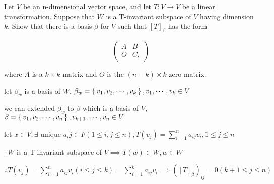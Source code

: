 Let $V$ be an n-dimensional vector space, and let $T: V \rightarrow V$ be a linear transformation. Suppose that $W$ is a T-invariant subspace of $V$ having dimension $k$. Show that there is a basis $\beta$ for $V$ such that $[T]_{\beta}$ has the form

$$\left( \begin{matrix}
	A&B\\O&C,
\end{matrix}\right)$$

where $A$ is a $k \times k$ matrix and $O$ is the $(n-k) \times k$ zero matrix.

\begin{tcolorbox}
	let $\beta_w$ is a basis of $W$, $\beta_w = \left\{ \,v_1,v_2,\cdots,v_k \,\right\}, v_1,\cdots,v_k \in V$
	
	we can extended $\beta_w$ to $\beta$ which is a basis of $V$, $\beta = \left\{ \,v_1,v_2,\cdots,v_n \,\right\}, v_{k+1},\cdots,v_n \in V$
	
	let $x \in V, \exists$ unique $a_ij \in F (1 \leq i,j \leq n), T(v_{j}) = \sum^n_{i=1}a_{ij}v_i, 1 \leq j \leq n$
	
	$\because W$ is a T-invariant subspace of $V \implies T(w) \in W, w\in W$
	
	$\therefore T(v_j) = \sum^{n}_{i=1}a_{ij}v_i(i \leq j \leq k) = \sum^k_{i=1} a_{ij} v_i \implies \left([T]_{\beta}\right)_{ij} = 0 (k+1 \leq j \leq n)$
	 
\end{tcolorbox}